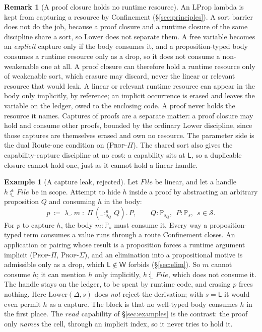 \documentclass[11pt]{article}
\newcommand{\Srt}{\mathcal{S}}
\newcommand{\Wk}{\mathsf{W}}
\newcommand{\Prop}[1]{\mathbb{P}_{#1}}            %
\newcommand{\im}{\mathsf{i}}                      %
\newcommand{\ex}{\mathsf{e}}                      %
\newcommand{\bind}[3]{#1\,{:}^{#2}_{#3}\,}        %
\newcommand{\Pifn}[4]{\Pi\,(\bind{#1}{#2}{#3}#4).\,}
\theoremstyle{definition}
\newtheorem{remark}[definition]{Remark}
\newtheorem{example}[definition]{Example}
\theoremstyle{plain}
\begin{document}
\begin{remark}[A proof closure holds no runtime resource]\label{rem:nocapture}
An \textsf{LProp} lambda is kept from capturing a resource by Confinement
(\S\ref{sec:principles}). A sort barrier does not do the job, because a proof
closure and a runtime closure of the same discipline share a sort, so
$\mathrm{Lower}$ does not separate them. A free variable becomes an \emph{explicit}
capture only if the body consumes it, and a proposition-typed body consumes a
runtime resource only as a drop, so it does not consume a non-weakenable one at
all. A proof closure can therefore hold a runtime resource only of weakenable
sort, which erasure may discard, never the linear or relevant resource that would
leak. A linear or relevant runtime resource can appear in the body only
implicitly, by reference; an implicit occurrence is erased and leaves the variable
on the ledger, owed to the enclosing code. A proof never holds the resource it
names. Captures of proofs are a separate matter: a proof closure may hold and
consume other proofs, bounded by the ordinary $\mathrm{Lower}$ discipline, since
those captures are themselves erased and own no resource. The parameter side is
the dual Route-one condition on \textsc{(Prop-$\Pi$)}. The shared sort also gives
the capability-capture discipline at no cost: a capability sits at $\mathsf{L}$, so
a duplicable closure cannot hold one, just as it cannot hold a linear handle.
\end{remark}

\begin{example}[A capture leak, rejected]\label{ex:nocapture}
Let $\mathit{File}$ be linear, and let a handle $\bind{h}{\ex}{\mathsf{L}}{\mathit{File}}$
be in scope. Attempt to hide $h$ inside a proof by abstracting an arbitrary
proposition $Q$ and consuming $h$ in the body:
\[
  p \;\coloneqq\; \lambda\_.\,m \;:\; \Pifn{\_}{\ex}{s_Q}{Q}P,
  \qquad Q:\Prop{s_Q},\ \ P:\Prop{s},\ \ s\in\Srt.
\]
For $p$ to capture $h$, the body $m:\Prop{s}$ must consume it. Every way a
proposition-typed term consumes a value runs through a route Confinement closes.
An application or pairing whose result is a proposition forces a runtime argument
implicit (\textsc{Prop-$\Pi$}, \textsc{Prop-$\Sigma$}), and an elimination into a
propositional motive is admissible only as a drop, which $\mathsf{L}\notin\Wk$
forbids (\S\ref{sec:elim}). So $m$ cannot consume $h$; it can mention $h$ only
implicitly, $\bind{h}{\im}{\mathsf{L}}{\mathit{File}}$, which does not consume it.
The handle stays on the ledger, to be spent by runtime code, and erasing $p$ frees
nothing. Here $\mathrm{Lower}(\Delta,s)$ does \emph{not} reject the derivation;
with $s=\mathsf{L}$ it would even permit $h$ as a capture. The block is that no
well-typed body consumes $h$ in the first place. The $\mathit{read}$ capability of
\S\ref{sec:examples} is the contrast: the proof only \emph{names} the cell,
through an implicit index, so it never tries to hold it.
\end{example}
\end{document}
